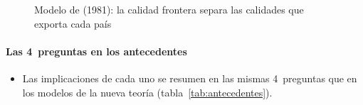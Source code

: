 \documentclass[11pt]{article}
\begin{document}
\begin{figure}[H]
\centering
\caption{Modelo de  (1981): la calidad frontera separa las calidades que exporta cada país}\label{fig:falvey}
\end{figure}

\paragraph{Las 4~preguntas en los antecedentes}

\begin{itemize}
\item Las implicaciones de cada uno se resumen en las mismas 4~preguntas que en los modelos de la nueva teoría (tabla~\ref{tab:antecedentes}).
\end{itemize}
\end{document}
